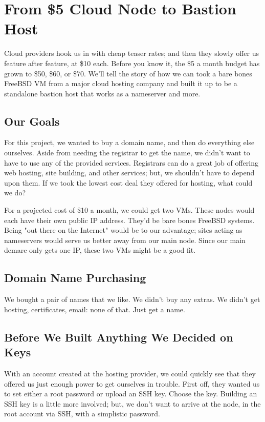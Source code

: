 \chapter{From \$5 Cloud Node to Bastion Host}


Cloud providers hook us in with cheap teaser rates; and then they slowly offer us feature after feature, at \$10 each.  Before you know it, the \$5 a month budget has grown to \$50, \$60, or \$70.  We'll tell the story of how we can took a bare bones FreeBSD VM from a major cloud hosting company and built it up to be a standalone bastion host that works as a nameserver and more.  


\section{Our Goals}
For this project, we wanted to buy a domain name, and then do everything else ourselves.  Aside from needing the registrar to get the name, we didn't want to have to use any of the provided services.  Registrars can do a great job of offering web hosting, site building, and other services; but, we shouldn't have to depend upon them.  If we took the lowest cost deal they offered for hosting, what could we do?


For a projected cost of \$10 a month, we could get two VMs.  These nodes would each have their own public IP address.  They'd be bare bones FreeBSD systems.  Being "out there on the Internet" would be to our advantage; sites acting as nameservers would serve us better away from our main node.  Since our main demarc only gets one IP, these two VMs might be a good fit.

\section{Domain Name Purchasing}
We bought a pair of names that we like.  We didn't buy any extras.  We didn't get hosting, \gls{certificate}s, email:  none of that.  Just get a name.


\section{Before We Built Anything We Decided on Keys}

With an account created at the hosting provider, we could quickly see that they offered us just enough power to get ourselves in trouble.  First off, they wanted us to set either a root \gls{password} or upload an SSH key.  Choose the key.  Building an SSH key is a little more involved; but, we don't want to arrive at the node, in the root account via SSH, with a simplistic \gls{password}.

